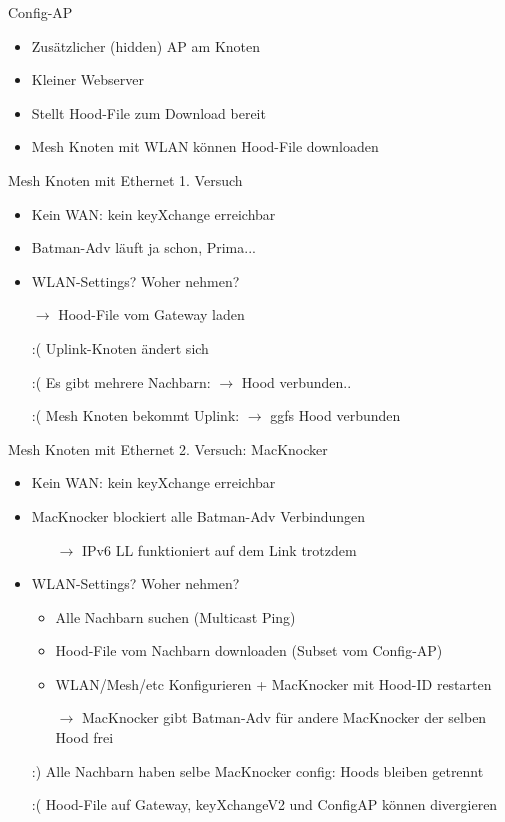 \begin{frame}{Config-AP}
    \begin{itemize}
        \item Zusätzlicher (hidden) AP am Knoten
        \item Kleiner Webserver
        \item Stellt Hood-File zum Download bereit
        \item Mesh Knoten mit WLAN können Hood-File downloaden
    \end{itemize}
\end{frame}

\begin{frame}{Mesh Knoten mit Ethernet}
    1. Versuch
    \begin{itemize}
        \item Kein WAN: kein keyXchange erreichbar
        \item Batman-Adv läuft ja schon, Prima...
        \item WLAN-Settings? Woher nehmen?
        \item[$\rightarrow$] Hood-File vom Gateway laden
        \item[:(] Uplink-Knoten ändert sich
        \item[:(] Es gibt mehrere Nachbarn: $\rightarrow$ Hood verbunden..
        \item[:(] Mesh Knoten bekommt Uplink: $\rightarrow$ ggfs Hood verbunden
    \end{itemize}
\end{frame}

\begin{frame}{Mesh Knoten mit Ethernet}
    2. Versuch: MacKnocker
    \begin{itemize}
        \item Kein WAN: kein keyXchange erreichbar
        \item MacKnocker blockiert alle Batman-Adv Verbindungen
        \begin{itemize}
            \item[$\rightarrow$] IPv6 LL funktioniert auf dem Link trotzdem
        \end{itemize}
        \item WLAN-Settings? Woher nehmen?
        \begin{itemize}
            \item Alle Nachbarn suchen (Multicast Ping)
            \item Hood-File vom Nachbarn downloaden (Subset vom Config-AP)
            \item WLAN/Mesh/etc Konfigurieren + MacKnocker mit Hood-ID restarten
            \item[$\rightarrow$] MacKnocker gibt Batman-Adv für andere MacKnocker der selben Hood frei
        \end{itemize}

        \item[:)] Alle Nachbarn haben selbe MacKnocker config: Hoods bleiben getrennt
        \item[:(] Hood-File auf Gateway, keyXchangeV2 und ConfigAP können divergieren
    \end{itemize}
\end{frame}

